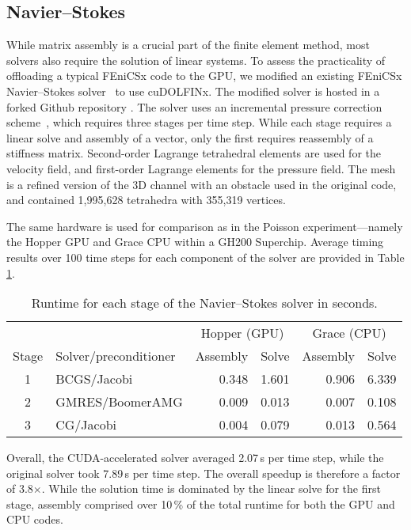 \subsection*{Navier--Stokes}

While matrix assembly is a crucial part of the finite element method, most solvers also require the solution of linear systems. To assess the practicality of offloading a typical FEniCSx code to the GPU, we modified an existing FEniCSx Navier--Stokes solver~\citep{dokkenipcs} to use cuDOLFINx. The modified solver is hosted in a forked Github repository \citep{pachevipcs}. The solver uses an incremental pressure correction scheme~\citep{dokken2019shape}, which requires three stages per time step. While each stage requires a linear solve and assembly of a vector, only the first requires reassembly of a stiffness matrix. Second-order Lagrange tetrahedral elements are used for the velocity field, and first-order Lagrange elements for the pressure field. The mesh is a refined version of the 3D channel with an obstacle used in the original code, and contained 1,995,628 tetrahedra with 355,319 vertices.

The same hardware is used for comparison as in the Poisson experiment---namely the Hopper GPU and Grace CPU within a GH200 Superchip. Average timing results over 100 time steps for each component of the solver are provided in Table \ref{tab:navier_stokes_results}.
\begin{table}[t]
    \centering
\begin{tabular}{clrrrr}
\toprule
      &                 & \multicolumn{2}{c}{Hopper (GPU)} & \multicolumn{2}{c}{Grace (CPU)} \\
                          \cmidrule(lr){3-4}               \cmidrule(lr){5-6}
Stage & Solver/preconditioner       & Assembly & Solve               & Assembly & Solve \\
\midrule
    1 & BCGS/Jacobi     &    0.348 &               1.601 &    0.906 & 6.339 \\
    2 & GMRES/BoomerAMG &    0.009 &               0.013 &    0.007 & 0.108 \\
    3 & CG/Jacobi       &    0.004 &               0.079 &    0.013 & 0.564 \\
\bottomrule
\end{tabular}
\caption{Runtime for each stage of the Navier--Stokes solver in seconds.}
    \label{tab:navier_stokes_results}
\end{table}
Overall, the CUDA-accelerated solver averaged 2.07\,s per time step, while the original solver took 7.89\,s per time step. The overall speedup is therefore a factor of 3.8${\times}$. While the solution time is dominated by the linear solve for the first stage, assembly comprised over 10\,\% of the total runtime for both the GPU and CPU codes.


